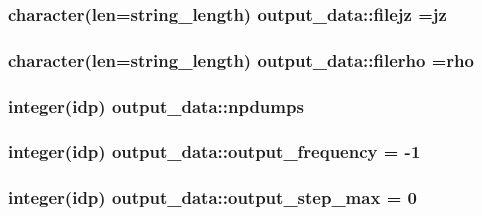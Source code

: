 \subsubsection[{\texorpdfstring{filejz}{filejz}}]{\setlength{\rightskip}{0pt plus 5cm}character(len=string\+\_\+length) output\+\_\+data\+::filejz =\textquotesingle{}jz\textquotesingle{}}\hypertarget{namespaceoutput__data_a3656388605a302a6fc4c579fe82eb10b}{}\label{namespaceoutput__data_a3656388605a302a6fc4c579fe82eb10b}
\subsubsection[{\texorpdfstring{filerho}{filerho}}]{\setlength{\rightskip}{0pt plus 5cm}character(len=string\+\_\+length) output\+\_\+data\+::filerho =\textquotesingle{}rho\textquotesingle{}}\hypertarget{namespaceoutput__data_abd9468ccde074971628171196a7873f2}{}\label{namespaceoutput__data_abd9468ccde074971628171196a7873f2}
\subsubsection[{\texorpdfstring{npdumps}{npdumps}}]{\setlength{\rightskip}{0pt plus 5cm}integer(idp) output\+\_\+data\+::npdumps}\hypertarget{namespaceoutput__data_a4dbfde333a6a2225527c27d33472032e}{}\label{namespaceoutput__data_a4dbfde333a6a2225527c27d33472032e}
\subsubsection[{\texorpdfstring{output\+\_\+frequency}{output_frequency}}]{\setlength{\rightskip}{0pt plus 5cm}integer(idp) output\+\_\+data\+::output\+\_\+frequency = -\/1}\hypertarget{namespaceoutput__data_aa9299257a58dc37dd6c11e96a637459a}{}\label{namespaceoutput__data_aa9299257a58dc37dd6c11e96a637459a}
\subsubsection[{\texorpdfstring{output\+\_\+step\+\_\+max}{output_step_max}}]{\setlength{\rightskip}{0pt plus 5cm}integer(idp) output\+\_\+data\+::output\+\_\+step\+\_\+max = 0}\hypertarget{namespaceoutput__data_a310f5ada2926521513b808272a40764d}{}\label{namespaceoutput__data_a310f5ada2926521513b808272a40764d}
